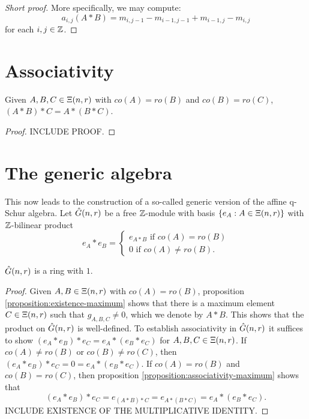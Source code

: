 \documentclass[a4paper, 11pt]{report}
\begin{document}
\begin{proof}[Short proof]
More specifically, we may compute:
\begin{equation*}
a_{i,j}(A\ast B) = m_{i,j-1} - m_{i-1,j-1} + m_{i-1,j} - m_{i,j}
\end{equation*}
for each $i,j\in\mathbb{Z}$.

\end{proof}


\section{Associativity}

\begin{proposition}\label{proposition:associativity-maximum}
Given $A,B,C\in\Xi(n,r)$ with $co(A)=ro(B)$ and $co(B)=ro(C)$, $(A\ast B)\ast C = A\ast (B\ast C)$.
\end{proposition}
\begin{proof}
INCLUDE PROOF.
\end{proof}

\section{The generic algebra}

This now leads to the construction of a so-called generic version of the affine q-Schur algebra. Let $\hat{G}(n,r)$ be a free $\mathbb{Z}$-module with basis $\{e_A:A\in\Xi(n,r)\}$ with $\mathbb{Z}$-bilinear product
\begin{equation*}
e_A\ast e_B = \begin{cases}
e_{A\ast B} \text{ if } co(A)=ro(B)\\
0 \text{ if } co(A)\neq ro(B).
\end{cases}
\end{equation*}

\begin{theorem}
$\hat{G}(n,r)$ is a ring with $1$.
\end{theorem}
\begin{proof}
Given $A,B\in\Xi(n,r)$ with $co(A)=ro(B)$, proposition \ref{proposition:existence-maximum} shows that there is a maximum element $C\in\Xi(n,r)$ such that $g_{A,B,C}\neq 0$, which we denote by $A\ast B$. This shows that the product on $\hat{G}(n,r)$ is well-defined. To establish associativity in $\hat{G}(n,r)$ it suffices to show $(e_A \ast e_B)\ast e_C = e_A\ast (e_B\ast e_C)$ for $A,B,C\in\Xi(n,r)$. If $co(A)\neq ro(B)$ or $co(B)\neq ro(C)$, then $(e_A\ast e_B)\ast e_C = 0 = e_A\ast (e_B\ast e_C)$. If $co(A)=ro(B)$ and $co(B)=ro(C)$, then proposition \ref{proposition:associativity-maximum} shows that
\begin{equation*}
(e_A\ast e_B)\ast e_C = e_{(A\ast B)\ast C} = e_{A\ast (B\ast C)} = e_A\ast (e_B\ast e_C).
\end{equation*}
INCLUDE EXISTENCE OF THE MULTIPLICATIVE IDENTITY.
\end{proof}
\end{document}

